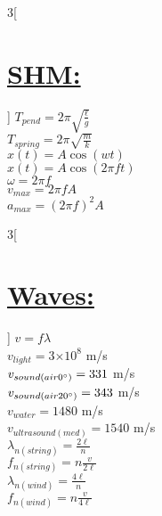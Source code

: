 \documentclass{article}[16pt]
\providecommand{\e}[1]{\ensuremath{\times 10^{#1}}}
\begin{document}
\begin{multicols}{3}[\section*{\underline {SHM:}}]
$T_{pend}=2\pi\sqrt{\frac{\ell}{g}}$\\
$T_{spring}=2\pi\sqrt{\frac{m}{k}}$\\
$x(t)=A\cos(wt)$\\
$x(t)=A\cos(2\pi ft)$\\
$\omega=2\pi f$\\
$v_{max}=2\pi fA$\\
$a_{max}=(2\pi f)^2A$
\end{multicols}
\begin{multicols}{3}[\section*{\underline {Waves:}}]
$v=f\lambda$\\
$v_{light}=3\e{8}$ m/s\\
$v_{sound(air 0\degree)}=331$ m/s\\
$v_{sound(air 20\degree)}=343$ m/s\\
$v_{water}=1480$ m/s\\
$v_{ultrasound(med)}=1540$ m/s\\
$\lambda_{n(string)}=\frac{2\ell}{n}$\\
$f_{n(string)}=n\frac{v}{2\ell}$\\
$\lambda_{n(wind)}=\frac{4\ell}{n}$\\
$f_{n(wind)}=n\frac{v}{4\ell}$
\end{multicols}
\end{document}
